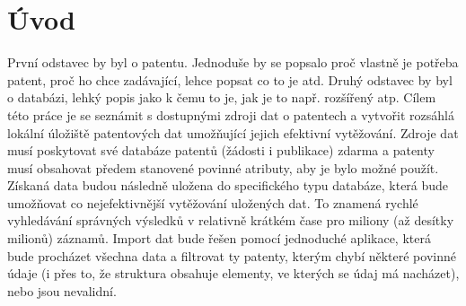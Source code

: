 \chapter{Úvod}
První odstavec by byl o patentu. Jednoduše by se popsalo proč vlastně je potřeba patent, proč ho chce zadávající, lehce popsat co to je atd.
\newline
\indent Druhý odstavec by byl o databázi, lehký popis jako k čemu to je, jak je to např. rozšířený atp.
\newline
\indent Cílem této práce je se seznámit s dostupnými zdroji dat o patentech a vytvořit rozsáhlá lokální úložiště patentových dat umožňující jejich efektivní vytěžování. Zdroje dat musí poskytovat své databáze patentů (žádosti i publikace) zdarma a patenty musí obsahovat předem stanovené povinné atributy, aby je bylo možné použít. Získaná data budou následně uložena do specifického typu databáze, která bude umožňovat co nejefektivnější vytěžování uložených dat. To znamená rychlé vyhledávání správných výsledků v relativně krátkém čase pro miliony (až desítky milionů) záznamů. Import dat bude řešen pomocí jednoduché aplikace, která bude procházet všechna data a filtrovat ty patenty, kterým chybí některé povinné údaje (i přes to, že struktura obsahuje elementy, ve kterých se údaj má nacházet), nebo jsou nevalidní. 

